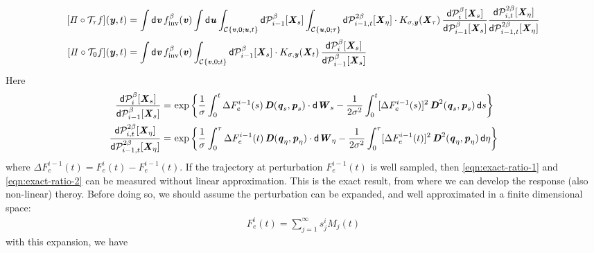 \documentclass[aip,jcp,a4paper,reprint,onecolumn]{revtex4-1}
\newcommand{\vect}[1]{\textbf{\textit{#1}}}
\newcommand{\dd}{\textsf{d}}
\newcommand{\inv}{\textrm{inv}}
\newcommand{\mt}{\mathcal T}
\newcommand{\mc}{\mathcal C}
\newcommand{\proj}{\mathit\Pi}
\begin{document}
\begin{align}\label{eqn:pert-exact-1}
  [\proj\circ\mt_\tau f](\vect y, t)
  &=
  \int\dd\vect v\,
  f_\inv^\beta(\vect v)
  \int\dd\vect u
  \int_{\mc\{\vect v,0; \vect u,t\}}
  \dd\mathcal P_{i-1}^\beta[\vect X_s]  
  \int_{\mc\{\vect u,0; \tau\}}
  \dd\mathcal P_{i-1,t}^{2\beta}[\vect X_\eta]\cdot
  K_{\sigma,\vect y}(\vect X_\tau)\,
  \frac
  {\dd\mathcal P_{i}^\beta[\vect X_s]}
  {\dd\mathcal P_{i-1}^\beta[\vect X_s]}
  \frac
  {\dd\mathcal P_{i,t}^{2\beta}[\vect X_\eta]}
  {\dd\mathcal P_{i-1,t}^{2\beta}[\vect X_\eta]}
  \\\label{eqn:pert-exact-2}
  [\proj\circ\mt_0 f](\vect y, t)
  &=
  \int\dd\vect v\,
  f_{\inv}^\beta(\vect v)
  \int_{\mc\{\vect v,0; t\}}
  \dd\mathcal P_{i-1}^\beta[\vect X_s]
  \cdot
  K_{\sigma,\vect y}(\vect X_t)\,
  \frac
  {\dd\mathcal P_{i}^\beta[\vect X_s]}
  {\dd\mathcal P_{i-1}^\beta[\vect X_s]}  
\end{align}
Here
\begin{align}\label{eqn:exact-ratio-1}
  \frac
  {\dd\mathcal P_{i}^\beta[\vect X_s]}
  {\dd\mathcal P_{i-1}^\beta[\vect X_s]}  
  =&\,
  \exp
  \bigg\{
  \frac{1}\sigma\int_0^t
  \Delta F_e^{i-1}(s)\,\vect D(\vect q_s,\vect p_s)\cdot\dd\vect W_s
  -
  \frac 1{2\sigma^2}\int_0^t
  [\Delta F_e^{i-1}(s)]^2\,\vect D^2(\vect q_s,\vect p_s)\,\dd s
  \bigg\}\\\label{eqn:exact-ratio-2}
  \frac
  {\dd\mathcal P_{i,t}^{2\beta}[\vect X_\eta]}
  {\dd\mathcal P_{i-1,t}^{2\beta}[\vect X_\eta]}
  =&\,
  \exp
  \bigg\{
  \frac{1}\sigma\int_0^\tau
  \Delta F_e^{i-1}(t)\,\vect D(\vect q_\eta,\vect p_\eta)\cdot\dd\vect W_\eta
  -
  \frac 1{2\sigma^2}\int_0^\tau
  [\Delta F_e^{i-1}(t)]^2\,\vect D^2(\vect q_\eta,\vect p_\eta)\,\dd \eta
  \bigg\}
\end{align}
where $\Delta F_e^{i-1}(t) = F_e^{i}(t) - F_e^{i-1}(t) $.
If the trajectory at perturbation $ F_e^{i-1}(t) $ is well sampled, then
\eqref{eqn:exact-ratio-1} and \eqref{eqn:exact-ratio-2} can be measured
without linear approximation.
This is the exact result, from where we can develop
the response (also non-linear) theroy.
Before doing so, we should assume the perturbation can be expanded,
and well approximated in a finite dimensional space:
\begin{align}
  F^i_e(t)
  =
  \sum_{j = 1}^\infty
  s^i_j M_j(t)
\end{align}
with this expansion, we have
\end{document}
